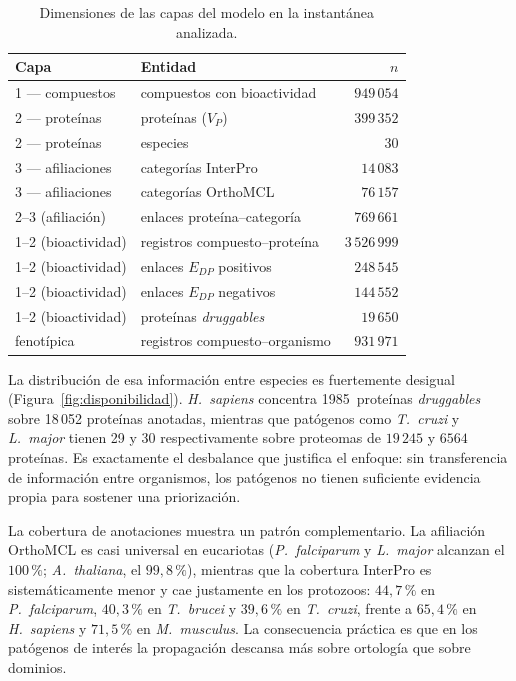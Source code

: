 \documentclass[11pt,a4paper]{article}
\newcommand{\spn}[1]{\textit{#1}}
\begin{document}
\begin{table}[H]
\centering
\caption{Dimensiones de las capas del modelo en la instantánea analizada.}
\label{tab:dimensiones}
\small
\begin{tabular}{llr}
\toprule
Capa & Entidad & $n$ \\
\midrule
1 --- compuestos      & compuestos con bioactividad          & $949\,054$ \\
2 --- proteínas       & proteínas ($V_P$)                    & $399\,352$ \\
2 --- proteínas       & especies                             & $30$ \\
3 --- afiliaciones    & categorías InterPro                  & $14\,083$ \\
3 --- afiliaciones    & categorías OrthoMCL                  & $76\,157$ \\
2--3 (afiliación)     & enlaces proteína--categoría          & $769\,661$ \\
1--2 (bioactividad)   & registros compuesto--proteína        & $3\,526\,999$ \\
1--2 (bioactividad)   & enlaces $E_{DP}$ positivos           & $248\,545$ \\
1--2 (bioactividad)   & enlaces $E_{DP}$ negativos           & $144\,552$ \\
1--2 (bioactividad)   & proteínas \emph{druggables}          & $19\,650$ \\
fenotípica            & registros compuesto--organismo       & $931\,971$ \\
\bottomrule
\end{tabular}
\end{table}

La distribución de esa información entre especies es fuertemente desigual
(Figura~\ref{fig:disponibilidad}). \spn{H.~sapiens} concentra 1985~proteínas
\emph{druggables} sobre 18\,052 proteínas anotadas, mientras que patógenos como
\spn{T.~cruzi} y \spn{L.~major} tienen 29 y 30 respectivamente sobre proteomas de
$19\,245$ y $6564$ proteínas. Es exactamente el desbalance que justifica el
enfoque: sin transferencia de información entre organismos, los patógenos no
tienen suficiente evidencia propia para sostener una priorización.

La cobertura de anotaciones muestra un patrón complementario. La afiliación
OrthoMCL es casi universal en eucariotas (\spn{P.~falciparum} y \spn{L.~major}
alcanzan el $100\,\%$; \spn{A.~thaliana}, el $99{,}8\,\%$), mientras que la
cobertura InterPro es sistemáticamente menor y cae justamente en los protozoos:
$44{,}7\,\%$ en \spn{P.~falciparum}, $40{,}3\,\%$ en \spn{T.~brucei} y
$39{,}6\,\%$ en \spn{T.~cruzi}, frente a $65{,}4\,\%$ en \spn{H.~sapiens} y
$71{,}5\,\%$ en \spn{M.~musculus}. La consecuencia práctica es que en los
patógenos de interés la propagación descansa más sobre ortología que sobre
dominios.
\end{document}

